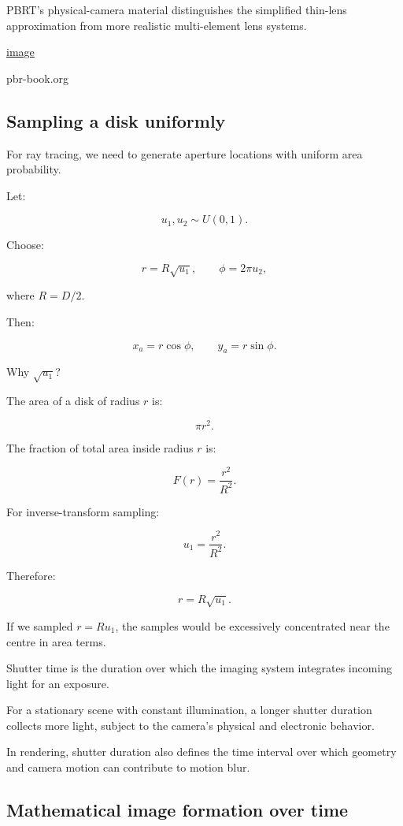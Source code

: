 PBRT's physical-camera material distinguishes the simplified thin-lens approximation from more realistic multi-element lens systems. 

\href{https://www.google.com/s2/favicons?domain=https://www.pbr-book.org&sz=32}{image}

pbr-book.org

\subsection{Sampling a disk uniformly}\label{02-foundations-ii-ch036-sampling-a-disk-uniformly}

For ray tracing, we need to generate aperture locations with uniform area probability.

Let:

\[ u_1,u_2\sim U(0,1). \]

Choose:

\[ \boxed{ r=R\sqrt{u_1}, \qquad \phi=2\pi u_2, } \]

where \(R=D/2\).

Then:

\[ \boxed{ x_a=r\cos\phi, \qquad y_a=r\sin\phi. } \]

Why \(\sqrt{u_1}\)?

The area of a disk of radius \(r\) is:

\[ \pi r^2. \]

The fraction of total area inside radius \(r\) is:

\[ F(r)=\frac{r^2}{R^2}. \]

For inverse-transform sampling:

\[ u_1=\frac{r^2}{R^2}. \]

Therefore:

\[ \boxed{r=R\sqrt{u_1}}. \]

If we sampled \(r=Ru_1\), the samples would be excessively concentrated near the centre in area terms.

Shutter time is the duration over which the imaging system integrates incoming light for an exposure.

For a stationary scene with constant illumination, a longer shutter duration collects more light, subject to the camera's physical and electronic behavior.

In rendering, shutter duration also defines the time interval over which geometry and camera motion can contribute to motion blur.

\subsection{Mathematical image formation over time}\label{02-foundations-ii-ch036-mathematical-image-formation-over-time}

